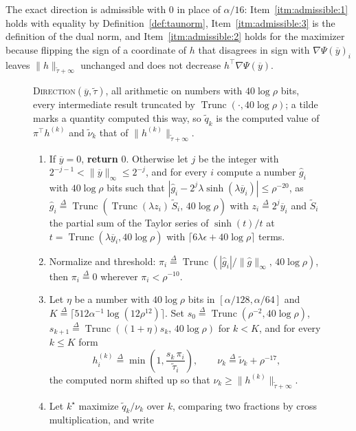 \documentclass[11pt]{article}
\newcommand{\Trunc}{\operatorname{Trunc}}
\newcommand{\tautil}{\widetilde{\tau}}
\newcommand{\ghat}{\widehat{g}}
\newcommand{\defeq}{\stackrel{\Delta}{=}}
\newenvironment{fminipage}%
  {\begin{Sbox}\begin{minipage}}%
  {\end{minipage}\end{Sbox}\fbox{\TheSbox}}
\newenvironment{algbox}[0]{\vskip 0.2in
\noindent 
\begin{fminipage}{6.3in}
}{
\end{fminipage}
\vskip 0.2in
}
\begin{document}
The exact direction is admissible with $0$ in place of
$\alpha / 16$: Item~\ref{itm:admissible:1} holds with equality by
Definition~\ref{def:taunorm}, Item~\ref{itm:admissible:3} is the definition of
the dual norm, and Item~\ref{itm:admissible:2} holds for the maximizer because
flipping the sign of a coordinate of $h$ that disagrees in sign with
$\nabla \Psi(\overline{y})_i$ leaves
$\|h\|_{\tautil + \infty}$ unchanged and does not decrease
$h^\top \nabla \Psi(\overline{y})$.

\begin{figure}[H]
\begin{algbox}
\textsc{Direction}$(\overline{y}, \tautil)$, all arithmetic on numbers with
$40 \log \rho$ bits, every intermediate result truncated by
$\Trunc(\cdot, 40 \log \rho)$; a tilde marks a quantity computed this way, so
$\widetilde{q}_k$ is the computed value of
$\pi^\top h^{(k)}$ and
$\widetilde{\nu}_k$ that of
$\|h^{(k)}\|_{\tautil + \infty}$.
\begin{enumerate}
\item If $\overline{y} = 0$, \textbf{return}
  $0$.
  Otherwise let $j$ be the integer with
  $2^{-j-1} < \|\overline{y}\|_{\infty} \le 2^{-j}$, and for every
  $i$ compute a number
  $\ghat_i$ with
  $40 \log \rho$ bits such that
  $|\ghat_i - 2^{j} \lambda \sinh(\lambda \overline{y}_i)| \le \rho^{-20}$, as
  $\ghat_i \defeq \Trunc(\Trunc(\lambda z_i) \, \widetilde{S}_i, \, 40 \log \rho)$
  with $z_i \defeq 2^{j} \overline{y}_i$ and
  $\widetilde{S}_i$ the partial sum of the Taylor series of
  $\sinh(t) / t$ at
  $t = \Trunc(\lambda \overline{y}_i, 40 \log \rho)$ with
  $\lceil 6 \lambda \epsilon + 40 \log \rho \rceil$ terms.
\item Normalize and threshold:
  $\pi_i \defeq \Trunc(|\ghat_i| / \|\ghat\|_{\infty}, \, 40 \log \rho)$, then
  $\pi_i \defeq 0$ wherever
  $\pi_i < \rho^{-10}$.
\item Let $\eta$ be a number with
  $40 \log \rho$ bits in
  $[\alpha / 128, \alpha / 64]$ and
  $K \defeq \lceil 512 \alpha^{-1} \log(12 \rho^{12}) \rceil$.
  Set $s_0 \defeq \Trunc(\rho^{-2}, 40 \log \rho)$,
  $s_{k + 1} \defeq \Trunc((1 + \eta) s_k, \, 40 \log \rho)$ for
  $k < K$, and for every
  $k \le K$ form
\[
h^{(k)}_i
\defeq
\min\left( 1, \frac{s_k \, \pi_i}{\tautil_i} \right),
\qquad
\nu_k \defeq \widetilde{\nu}_k + \rho^{-17} ,
\]
the computed norm shifted up so that $\nu_k \ge \|h^{(k)}\|_{\tautil + \infty}$.
\item Let $k^{\star}$ maximize
  $\widetilde{q}_k / \nu_k$ over
  $k$, comparing two fractions by cross multiplication, and write

\end{enumerate}
\end{algbox}
\end{figure}
\end{document}
